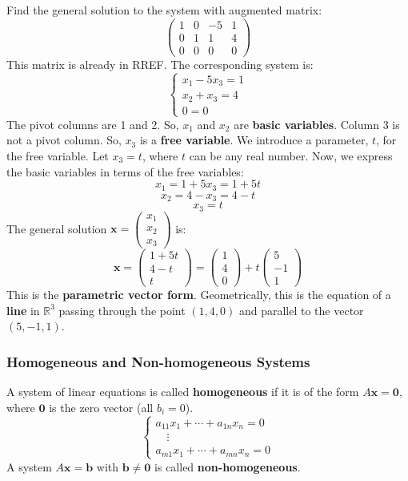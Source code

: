 \begin{example}
Find the general solution to the system with augmented matrix:
\[
\left(\begin{array}{ccc|c}
1 & 0 & -5 & 1 \\
0 & 1 & 1 & 4 \\
0 & 0 & 0 & 0
\end{array}\right)
\]
This matrix is already in RREF. The corresponding system is:
\[
\begin{cases}
x_1 - 5x_3 = 1 \\
x_2 + x_3 = 4 \\
0 = 0
\end{cases}
\]
The pivot columns are 1 and 2. So, $x_1$ and $x_2$ are \textbf{basic variables}.
Column 3 is not a pivot column. So, $x_3$ is a \textbf{free variable}.
We introduce a parameter, $t$, for the free variable. Let $x_3 = t$, where $t$ can be any real number.
Now, we express the basic variables in terms of the free variables:
\[ x_1 = 1 + 5x_3 = 1 + 5t \]
\[ x_2 = 4 - x_3 = 4 - t \]
\[ x_3 = t \]
The general solution $\mathbf{x} = \begin{pmatrix} x_1 \\ x_2 \\ x_3 \end{pmatrix}$ is:
\[ \mathbf{x} = \begin{pmatrix} 1 + 5t \\ 4 - t \\ t \end{pmatrix} = \begin{pmatrix} 1 \\ 4 \\ 0 \end{pmatrix} + t \begin{pmatrix} 5 \\ -1 \\ 1 \end{pmatrix} \]
This is the \textbf{parametric vector form}.
Geometrically, this is the equation of a \textbf{line} in $\mathbb{R}^3$ passing through the point $(1, 4, 0)$ and parallel to the vector $(5, -1, 1)$.
\end{example}

\subsubsection{Homogeneous and Non-homogeneous Systems}

\begin{definition}
A system of linear equations is called \textbf{homogeneous} if it is of the form $A\mathbf{x} = \mathbf{0}$, where $\mathbf{0}$ is the zero vector (all $b_i = 0$).
\[
\begin{cases}
a_{11}x_1 + \cdots + a_{1n}x_n = 0\\
\quad \vdots \\
a_{m1}x_1 + \cdots + a_{mn}x_n = 0
\end{cases}
\]
A system $A\mathbf{x} = \mathbf{b}$ with $\mathbf{b} \neq \mathbf{0}$ is called \textbf{non-homogeneous}.
\end{definition}


